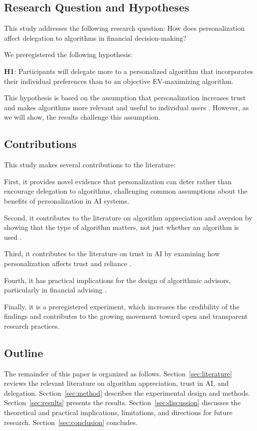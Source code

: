 \subsection{Research Question and Hypotheses}

This study addresses the following research question: How does personalization affect delegation to algorithms in financial decision-making?

We preregistered the following hypothesis:

\textbf{H1}: Participants will delegate more to a personalized algorithm that incorporates their individual preferences than to an objective EV-maximizing algorithm.

This hypothesis is based on the assumption that personalization increases trust and makes algorithms more relevant and useful to individual users \citep{longoni2019, jussupow2020}. However, as we will show, the results challenge this assumption.

\subsection{Contributions}

This study makes several contributions to the literature:

First, it provides novel evidence that personalization can deter rather than encourage delegation to algorithms, challenging common assumptions about the benefits of personalization in AI systems.

Second, it contributes to the literature on algorithm appreciation and aversion by showing that the type of algorithm matters, not just whether an algorithm is used \citep{dietvorst2015, logg2019}.

Third, it contributes to the literature on trust in AI by examining how personalization affects trust and reliance \citep{lee2004, kohn2021}.

Fourth, it has practical implications for the design of algorithmic advisors, particularly in financial advising \citep{holzmeister2023}.

Finally, it is a preregistered experiment, which increases the credibility of the findings and contributes to the growing movement toward open and transparent research practices.

\subsection{Outline}

The remainder of this paper is organized as follows. Section~\ref{sec:literature} reviews the relevant literature on algorithm appreciation, trust in AI, and delegation. Section~\ref{sec:method} describes the experimental design and methods. Section~\ref{sec:results} presents the results. Section~\ref{sec:discussion} discusses the theoretical and practical implications, limitations, and directions for future research. Section~\ref{sec:conclusion} concludes.